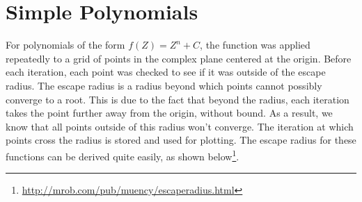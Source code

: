 \documentclass[12pt]{article}
\begin{document}
\section*{Simple Polynomials}
For polynomials of the form $f(Z)= Z^n+C$, the function was applied repeatedly to a grid of points in the complex plane centered at the origin. Before each iteration, each point was checked to see if it was outside of the escape radius. The escape radius is a radius beyond which points cannot possibly converge to a root. This is due to the fact that beyond the radius, each iteration takes the point further away from the origin, without bound. As a result, we know that all points outside of this radius won’t converge. The iteration at which points cross the radius is stored and used for plotting. The escape radius for these functions can be derived quite easily, as shown below\footnote{\url{http://mrob.com/pub/muency/escaperadius.html}}.
\end{document}
